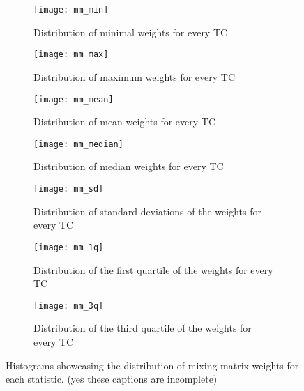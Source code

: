 \begin{figure}[htp]
    \centering
    \begin{subfigure}[t]{.3\textwidth}
        \centering
        \texttt{[image: mm\_min]}
        \caption{Distribution of minimal weights for every TC}
        \label{plt:mm_min}
    \end{subfigure}\quad
    \begin{subfigure}[t]{.3\textwidth}
        \centering
        \texttt{[image: mm\_max]}
        \caption{Distribution of maximum weights for every TC}
        \label{plt:mm_max}
    \end{subfigure}\quad
    \begin{subfigure}[t]{.3\textwidth}
        \centering
        \texttt{[image: mm\_mean]}
        \caption{Distribution of mean weights for every TC}
        \label{plt:mm_mean}
    \end{subfigure}
    \begin{subfigure}[t]{.3\textwidth}
        \centering
        \texttt{[image: mm\_median]}
        \caption{Distribution of median weights for every TC}
        \label{plt:mm_median}
    \end{subfigure}\quad
    \begin{subfigure}[t]{.3\textwidth}
        \centering
        \texttt{[image: mm\_sd]}
        \caption{Distribution of standard deviations of the weights for every TC}
        \label{plt:mm_sd}
    \end{subfigure}\quad
    \begin{subfigure}[t]{.3\textwidth}
        \centering
        \texttt{[image: mm\_1q]}
        \caption{Distribution of the first quartile of the weights for every TC}
        \label{plt:mm_1q}
    \end{subfigure}
    \begin{subfigure}[t]{.3\textwidth}
        \centering
        \texttt{[image: mm\_3q]}
        \caption{Distribution of the third quartile of the weights for every TC}
        \label{plt:mm_3q}
    \end{subfigure}\quad
    \caption{Histograms showcasing the distribution of mixing matrix weights for each statistic. (yes these captions are incomplete)}
\end{figure}
